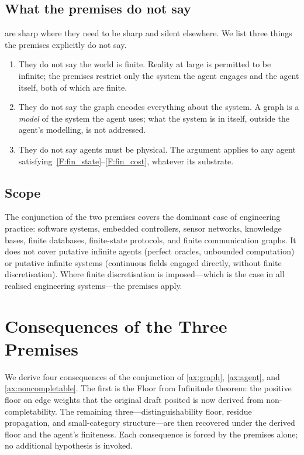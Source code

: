 \documentclass[11pt,twocolumn,a4paper]{article}
\theoremstyle{thmstyle}
\theoremstyle{definition}
\theoremstyle{remark}
\begin{document}
\subsection{What the premises do not say}

 are sharp where they need to be sharp and
silent elsewhere. We list three things the premises explicitly do
not say.

\begin{enumerate}[nosep,leftmargin=*]
\item They do not say the world is finite. Reality at large is
permitted to be infinite; the premises restrict only the system the
agent engages and the agent itself, both of which are finite.
\item They do not say the graph encodes everything about the system.
A graph is a \emph{model} of the system the agent uses; what the
system is in itself, outside the agent's modelling, is not
addressed.
\item They do not say agents must be physical. The argument applies
to any agent satisfying~\ref{F:fin_state}--\ref{F:fin_cost},
whatever its substrate.
\end{enumerate}

\subsection{Scope}

The conjunction of the two premises covers the dominant case of
engineering practice: software systems, embedded controllers,
sensor networks, knowledge bases, finite databases, finite-state
protocols, and finite communication graphs. It does not cover
putative infinite agents (perfect oracles, unbounded computation) or
putative infinite systems (continuous fields engaged directly,
without finite discretisation). Where finite discretisation is
imposed---which is the case in all realised engineering
systems---the premises apply.

\section{Consequences of the Three Premises}
\label{sec:consequences}

We derive four consequences of the conjunction of \cref{ax:graph},
\cref{ax:agent}, and \cref{ax:noncompletable}. The first is the
Floor from Infinitude theorem: the positive floor on edge weights
that the original draft posited is now derived from
non-completability. The remaining three---distinguishability floor,
residue propagation, and small-category structure---are then
recovered under the derived floor and the agent's finiteness. Each
consequence is forced by the premises alone; no additional
hypothesis is invoked.
\end{document}
